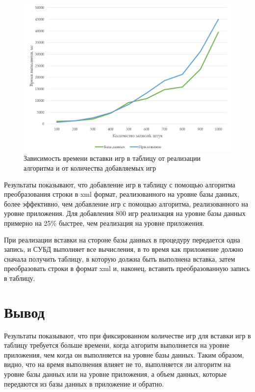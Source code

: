 \begin{figure}[H]
	\centering

	\includegraphics[scale=0.8]{../imgs/experiment.png}
	\captionsetup{justification=centering}
	\caption{Зависимость времени вставки игр в таблицу от реализации алгоритма и от количества добавляемых игр}
	\label{img:experiment1}
\end{figure}

Результаты показывают, что добавление игр в таблицу с помощью алгоритма преобразования строки в xml формат, реализованного на уровне базы данных, более эффективно, чем добавление игр с помощью алгоритма, реализованного на уровне приложения. Для добавления 800 игр реализация на уровне базы данных примерно на 25\% быстрее, чем реализация на уровне приложения.

При реализации вставки на стороне базы данных в процедуру передается одна запись, и СУБД выполняет все вычисления, в то время как приложение должно сначала получить таблицу, в которую должна быть выполнена вставка, затем преобразовать строки в формат xml и, наконец, вставить преобразованную запись в таблицу.  

\section{Вывод}

Результаты показывают, что при фиксированном количестве игр для вставки игр в таблицу требуется больше времени, когда алгоритм выполняется на уровне приложения, чем когда он выполняется на уровне базы данных. Таким образом, видно, что на время выполнения влияет не то, выполняется ли алгоритм на уровне базы данных или на уровне приложения, а объем данных, которые передаются из базы данных в приложение и обратно.


